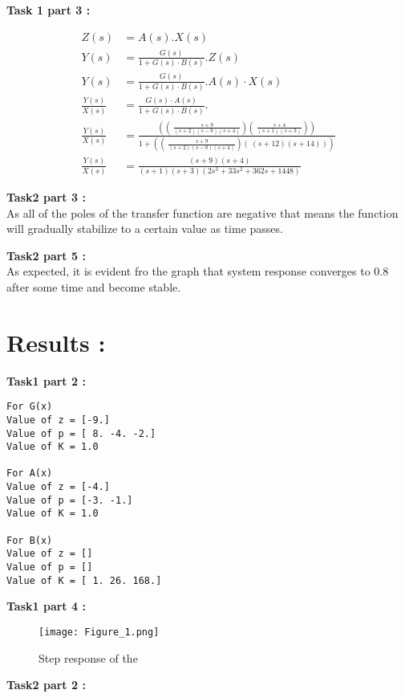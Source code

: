 \documentclass[11pt]{article}
\begin{document}
\textbf{Task 1 part 3 :}

\begin{align*}
Z(s) &= A(s).X(s)
\\ Y(s) &= \frac{G(s)}{1+G(s)\cdot B(s)}.Z(s)
\\ Y(s) &= \frac{G(s)}{1+G(s)\cdot B(s)}.A(s)\cdot X(s)
\\ \frac{Y(s)}{X(s)} &= \frac{G(s)\cdot A(s)}{1+G(s)\cdot B(s)}.
\\\frac{Y(s)}{X(s)} &= \frac{\left(\left(\:\frac{s+9}{\left(s+2\right)\left(s-8\right)\left(s+4\right)}\right)\left(\:\frac{s+4}{\left(s+1\right)\left(s+3\right)}\right)\right)}{1+\left(\left(\:\frac{s+9}{\left(s+2\right)\left(s-8\right)\left(s+4\right)}\right)\left(\:\left(s+12\right)\left(s+14\right)\right)\right)}
\\ \frac{Y(s)}{X(s)} &= \frac{\left(s+9\right)\left(s+4\right)}{\left(s+1\right)\left(s+3\right)\left(2s^3+33s^2+362s+1448\right)}
\end{align*}

\textbf{Task2 part 3 :}
\\ As all of the poles of the transfer function are negative that means the function will gradually stabilize to a certain value as time passes.

\textbf{Task2 part 5 :}
\\ As expected, it is evident fro the graph that system response converges to 0.8 after some time and become stable.

\section{Results :}
\textbf{Task1 part 2 :}

\begin{verbatim}
For G(x)
Value of z = [-9.]
Value of p = [ 8. -4. -2.]
Value of K = 1.0

For A(x)
Value of z = [-4.]
Value of p = [-3. -1.]
Value of K = 1.0

For B(x)
Value of z = []
Value of p = []
Value of K = [ 1. 26. 168.]
\end{verbatim}



\textbf{Task1 part 4 :}
\begin{figure}[H]
\centering
\texttt{[image: Figure\_1.png]}
\caption{Step response of the }
\label{fig:my_label}
\end{figure}




\textbf{Task2 part 2 :}
\end{document}
